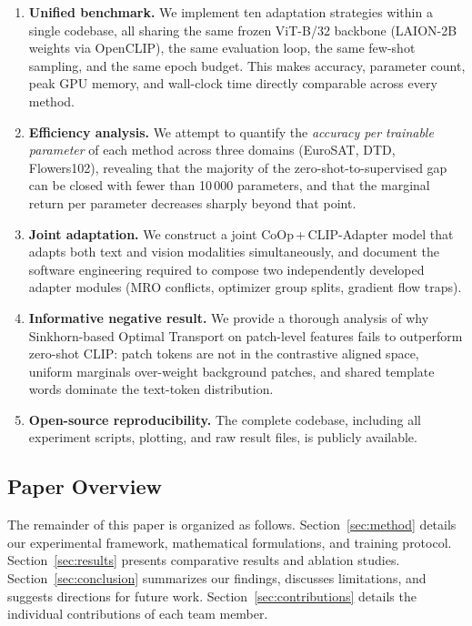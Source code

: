\documentclass[10pt,twocolumn,letterpaper]{article}
\begin{document}
\begin{enumerate}
  \item \textbf{Unified benchmark.} We implement ten adaptation strategies within a single codebase, all sharing the same frozen ViT-B/32 backbone (LAION-2B weights via OpenCLIP), the same evaluation loop, the same few-shot sampling, and  the same epoch budget. This makes accuracy, parameter count, peak GPU memory, and wall-clock time directly comparable across every method.

  \item \textbf{Efficiency analysis.} We attempt to quantify the \emph{accuracy per trainable parameter} of each method across three domains (EuroSAT, DTD, Flowers102), revealing that the majority of the zero-shot-to-supervised gap can be closed with fewer than 10\,000 parameters, and that the marginal return per parameter decreases sharply beyond that
  point.

  \item \textbf{Joint adaptation.} We construct a joint CoOp\,+\,CLIP-Adapter model that adapts both text and vision
  modalities simultaneously, and document the software engineering required to compose two independently developed adapter
  modules (MRO conflicts, optimizer group splits, gradient flow traps).

  \item \textbf{Informative negative result.} We provide a thorough analysis of why Sinkhorn-based Optimal Transport on patch-level features fails to outperform zero-shot CLIP: patch tokens are not in the contrastive aligned space, uniform marginals over-weight background patches, and shared template words dominate the text-token distribution.

  \item \textbf{Open-source reproducibility.} The complete codebase, including all experiment scripts, plotting, and raw result files, is publicly available.
  
\end{enumerate}


\subsection{Paper Overview}

The remainder of this paper is organized as follows.
Section~\ref{sec:method} details our experimental framework, mathematical formulations, and training protocol.
Section~\ref{sec:results} presents comparative results and ablation studies.
Section~\ref{sec:conclusion} summarizes our findings, discusses limitations, and suggests directions for future work.
Section~\ref{sec:contributions} details the individual contributions of each team member.
\end{document}
